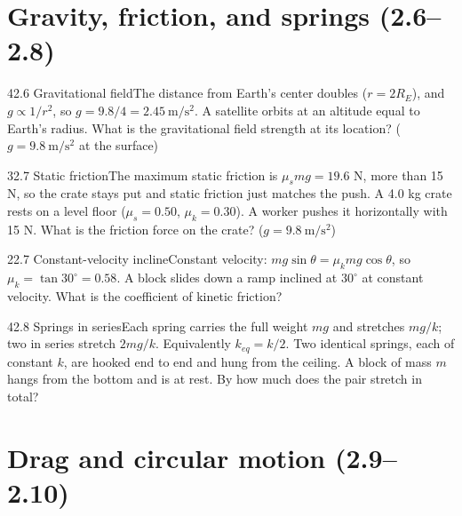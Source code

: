 \documentclass[11pt]{article}
\begin{document}
\section{Gravity, friction, and springs (2.6--2.8)}

\begin{q}{4}{2.6 Gravitational field}{The distance from Earth's center doubles ($r = 2R_E$), and $g \propto 1/r^2$, so $g = 9.8/4 = 2.45\ \mathrm{m/s^2}$.}
A satellite orbits at an altitude equal to Earth's radius. What is the gravitational field strength at its location? ($g = 9.8\ \mathrm{m/s^2}$ at the surface)
\end{q}
\begin{q}{3}{2.7 Static friction}{The maximum static friction is $\mu_s mg = 19.6$ N, more than 15 N, so the crate stays put and static friction just matches the push.}
A 4.0 kg crate rests on a level floor ($\mu_s = 0.50$, $\mu_k = 0.30$). A worker pushes it horizontally with 15 N. What is the friction force on the crate? ($g = 9.8\ \mathrm{m/s^2}$)
\end{q}
\begin{q}{2}{2.7 Constant-velocity incline}{Constant velocity: $mg\sin\theta = \mu_k mg\cos\theta$, so $\mu_k = \tan 30^\circ = 0.58$.}
A block slides down a ramp inclined at $30^\circ$ at constant velocity. What is the coefficient of kinetic friction?
\end{q}
\begin{q}{4}{2.8 Springs in series}{Each spring carries the full weight $mg$ and stretches $mg/k$; two in series stretch $2mg/k$. Equivalently $k_{eq} = k/2$.}
Two identical springs, each of constant $k$, are hooked end to end and hung from the ceiling. A block of mass $m$ hangs from the bottom and is at rest. By how much does the pair stretch in total?
\end{q}

\section{Drag and circular motion (2.9--2.10)}
\end{document}
